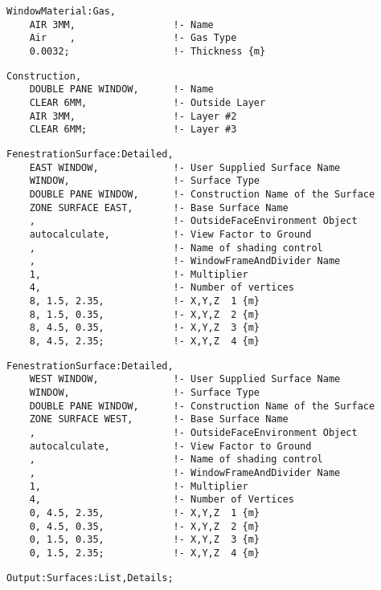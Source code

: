 \begin{lstlisting}
WindowMaterial:Gas,
    AIR 3MM,                 !- Name
    Air    ,                 !- Gas Type
    0.0032;                  !- Thickness {m}
\end{lstlisting}

\begin{lstlisting}
Construction,
    DOUBLE PANE WINDOW,      !- Name
    CLEAR 6MM,               !- Outside Layer
    AIR 3MM,                 !- Layer #2
    CLEAR 6MM;               !- Layer #3
\end{lstlisting}

\begin{lstlisting}
FenestrationSurface:Detailed,
    EAST WINDOW,             !- User Supplied Surface Name
    WINDOW,                  !- Surface Type
    DOUBLE PANE WINDOW,      !- Construction Name of the Surface
    ZONE SURFACE EAST,       !- Base Surface Name
    ,                        !- OutsideFaceEnvironment Object
    autocalculate,           !- View Factor to Ground
    ,                        !- Name of shading control
    ,                        !- WindowFrameAndDivider Name
    1,                       !- Multiplier
    4,                       !- Number of vertices
    8, 1.5, 2.35,            !- X,Y,Z  1 {m}
    8, 1.5, 0.35,            !- X,Y,Z  2 {m}
    8, 4.5, 0.35,            !- X,Y,Z  3 {m}
    8, 4.5, 2.35;            !- X,Y,Z  4 {m}
\end{lstlisting}

\begin{lstlisting}
FenestrationSurface:Detailed,
    WEST WINDOW,             !- User Supplied Surface Name
    WINDOW,                  !- Surface Type
    DOUBLE PANE WINDOW,      !- Construction Name of the Surface
    ZONE SURFACE WEST,       !- Base Surface Name
    ,                        !- OutsideFaceEnvironment Object
    autocalculate,           !- View Factor to Ground
    ,                        !- Name of shading control
    ,                        !- WindowFrameAndDivider Name
    1,                       !- Multiplier
    4,                       !- Number of Vertices
    0, 4.5, 2.35,            !- X,Y,Z  1 {m}
    0, 4.5, 0.35,            !- X,Y,Z  2 {m}
    0, 1.5, 0.35,            !- X,Y,Z  3 {m}
    0, 1.5, 2.35;            !- X,Y,Z  4 {m}
\end{lstlisting}

\begin{lstlisting}
Output:Surfaces:List,Details;
\end{lstlisting}

